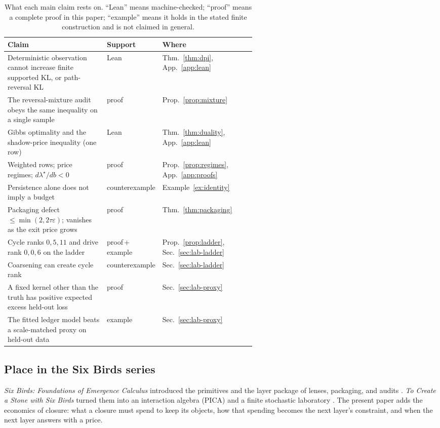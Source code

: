 \begin{table}[tbp]
\centering
\small
\renewcommand{\arraystretch}{1.12}
\caption{What each main claim rests on. ``Lean'' means machine-checked; ``proof'' means a complete proof in this paper; ``example'' means it holds in the stated finite construction and is not claimed in general.}
\label{tab:status}
\begin{tabularx}{\linewidth}{L{0.40\linewidth}L{0.17\linewidth}Y}
\toprule
Claim & Support & Where \\
\midrule
Deterministic observation cannot increase finite supported KL, or path-reversal KL & Lean & Thm.~\ref{thm:dpi}, App.~\ref{app:lean} \\
The reversal-mixture audit obeys the same inequality on a single sample & proof & Prop.~\ref{prop:mixture} \\
Gibbs optimality and the shadow-price inequality (one row) & Lean & Thm.~\ref{thm:duality}, App.~\ref{app:lean} \\
Weighted rows; price regimes; \(d\lambda^\star/db<0\) & proof & Prop.~\ref{prop:regimes}, App.~\ref{app:proofs} \\
Persistence alone does not imply a budget & counterexample & Example~\ref{ex:identity} \\
Packaging defect \(\le \min(2,2\tau\varepsilon)\); vanishes as the exit price grows & proof & Thm.~\ref{thm:packaging} \\
Cycle ranks \(0,5,11\) and drive rank \(0,0,6\) on the ladder & proof\,+\,example & Prop.~\ref{prop:ladder}, Sec.~\ref{sec:lab-ladder} \\
Coarsening can create cycle rank & counterexample & Sec.~\ref{sec:lab-ladder} \\
A fixed kernel other than the truth has positive expected excess held-out loss & proof & Sec.~\ref{sec:lab-proxy} \\
The fitted ledger model beats a scale-matched proxy on held-out data & example & Sec.~\ref{sec:lab-proxy} \\
\bottomrule
\end{tabularx}
\end{table}

\subsection{Place in the Six Birds series}

\emph{Six Birds: Foundations of Emergence Calculus} introduced the primitives and the layer package of lenses, packaging, and audits \cite{tsiokos2026sixbirds}. \emph{To Create a Stone with Six Birds} turned them into an interaction algebra (PICA) and a finite stochastic laboratory \cite{tsiokos2026create}. The present paper adds the economics of closure: what a closure must spend to keep its objects, how that spending becomes the next layer's constraint, and when the next layer answers with a price.
